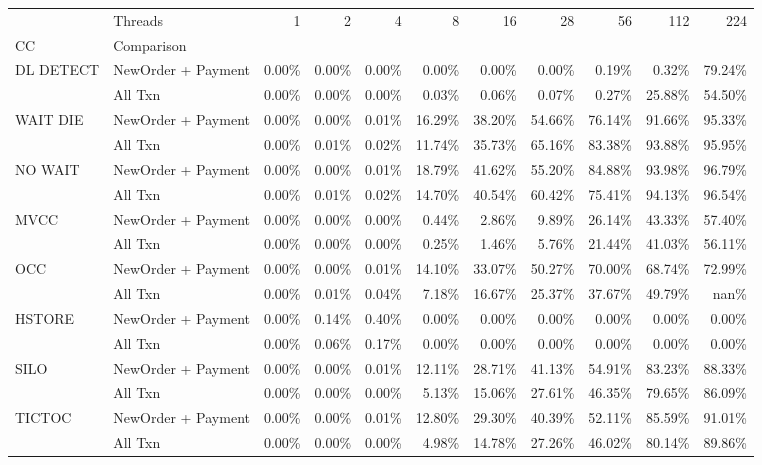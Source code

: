 \begin{tabular}{llrrrrrrrrr}
\toprule
       & Threads &   1   &   2   &   4   &    8   &    16  &    28  &    56  &    112 &    224 \\
CC & Comparison &       &       &       &        &        &        &        &        &        \\
\midrule
DL DETECT & NewOrder + Payment & 0.00\% & 0.00\% & 0.00\% &  0.00\% &  0.00\% &  0.00\% &  0.19\% &  0.32\% & 79.24\% \\
       & All Txn & 0.00\% & 0.00\% & 0.00\% &  0.03\% &  0.06\% &  0.07\% &  0.27\% & 25.88\% & 54.50\% \\
WAIT DIE & NewOrder + Payment & 0.00\% & 0.00\% & 0.01\% & 16.29\% & 38.20\% & 54.66\% & 76.14\% & 91.66\% & 95.33\% \\
       & All Txn & 0.00\% & 0.01\% & 0.02\% & 11.74\% & 35.73\% & 65.16\% & 83.38\% & 93.88\% & 95.95\% \\
NO WAIT & NewOrder + Payment & 0.00\% & 0.00\% & 0.01\% & 18.79\% & 41.62\% & 55.20\% & 84.88\% & 93.98\% & 96.79\% \\
       & All Txn & 0.00\% & 0.01\% & 0.02\% & 14.70\% & 40.54\% & 60.42\% & 75.41\% & 94.13\% & 96.54\% \\
MVCC & NewOrder + Payment & 0.00\% & 0.00\% & 0.00\% &  0.44\% &  2.86\% &  9.89\% & 26.14\% & 43.33\% & 57.40\% \\
       & All Txn & 0.00\% & 0.00\% & 0.00\% &  0.25\% &  1.46\% &  5.76\% & 21.44\% & 41.03\% & 56.11\% \\
OCC & NewOrder + Payment & 0.00\% & 0.00\% & 0.01\% & 14.10\% & 33.07\% & 50.27\% & 70.00\% & 68.74\% & 72.99\% \\
       & All Txn & 0.00\% & 0.01\% & 0.04\% &  7.18\% & 16.67\% & 25.37\% & 37.67\% & 49.79\% &   nan\% \\
HSTORE & NewOrder + Payment & 0.00\% & 0.14\% & 0.40\% &  0.00\% &  0.00\% &  0.00\% &  0.00\% &  0.00\% &  0.00\% \\
       & All Txn & 0.00\% & 0.06\% & 0.17\% &  0.00\% &  0.00\% &  0.00\% &  0.00\% &  0.00\% &  0.00\% \\
SILO & NewOrder + Payment & 0.00\% & 0.00\% & 0.01\% & 12.11\% & 28.71\% & 41.13\% & 54.91\% & 83.23\% & 88.33\% \\
       & All Txn & 0.00\% & 0.00\% & 0.00\% &  5.13\% & 15.06\% & 27.61\% & 46.35\% & 79.65\% & 86.09\% \\
TICTOC & NewOrder + Payment & 0.00\% & 0.00\% & 0.01\% & 12.80\% & 29.30\% & 40.39\% & 52.11\% & 85.59\% & 91.01\% \\
       & All Txn & 0.00\% & 0.00\% & 0.00\% &  4.98\% & 14.78\% & 27.26\% & 46.02\% & 80.14\% & 89.86\% \\
\bottomrule
\end{tabular}
